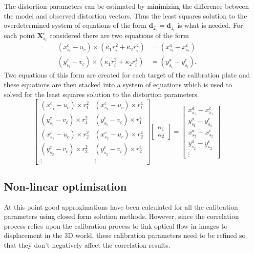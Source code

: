 \documentclass[12pt,oneside,openany,a4paper, %
english, %
masters-t, goldenblock]{usthesis}
\begin{document}
The distortion parameters can be estimated by minimizing the difference between the model and observed distortion vectors. Thus the least squares solution to the overdetermined system of equations of the form $\bm{d}_{2_i} = \bm{d}_{1_i}$ is what is needed. For each point $\bm{X}_{s_i}^c$ considered there are two equations of the form
\begin{align}
  (x_{s_i}^c - u_c) \times (\kappa_1 r_i^2 + \kappa_2 r_i^4) &= (x_{s_i}^{a} - x_{s_i}^{c}) \\
  (y_{s_i}^c - v_c) \times (\kappa_1 r_i^2 + \kappa_2 r_i^4) &= (y_{s_i}^{a} - y_{s_i}^{c}).
\end{align}
Two equations of this form are created for each target of the calibration plate and these equations are then stacked into a system of equations which is used to solved for the least squares solution to the distortion parameters.
\begin{equation}
  \begin{bmatrix}
    (x_{s_1}^c - u_c) \times r_1^2 & (x_{s_1}^c - u_c) \times r_1^4\\
    (y_{s_1}^c - v_c) \times r_1^2 & (y_{s_1}^c - v_c) \times r_1^4\\
    (x_{s_2}^c - u_c) \times r_2^2 & (x_{s_2}^c - u_c) \times r_2^4\\
    (y_{s_2}^c - v_c) \times r_2^2 & (y_{s_2}^c - v_c) \times r_2^4\\
    \vdots & \vdots
  \end{bmatrix}
  \begin{bmatrix}
    \kappa_1 \\
    \kappa_2
  \end{bmatrix} =
  \begin{bmatrix}
    x_{s_1}^{a} - x_{s_1}^{c}\\
    y_{s_1}^{a} - y_{s_1}^{c}\\
    x_{s_2}^{a} - x_{s_2}^{c}\\
    y_{s_2}^{a} - y_{s_2}^{c}\\
    \vdots
  \end{bmatrix}
\end{equation}

\subsection{Non-linear optimisation}
At this point good approximations have been calculated for all the calibration parameters using closed form solution methods. However, since the correlation process relies upon the calibration process to link optical flow in images to displacement in the 3D world, these calibration parameters need to be refined so that they don't negatively affect the correlation results. 
\end{document}
